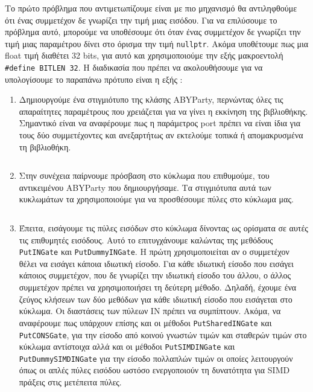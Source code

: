 Το πρώτο πρόβλημα που αντιμετωπίζουμε είναι με πιο μηχανισμό θα αντιληφθούμε ότι ένας συμμετέχον δε γνωρίζει την τιμή μιας εισόδου. Για να επιλύσουμε το πρόβλημα αυτό, μπορούμε να υποθέσουμε ότι όταν ένας συμμετέχον δε γνωρίζει την τιμή μιας παραμέτρου δίνει στο όρισμα την τιμή \texttt{nullptr}. Ακόμα υποθέτουμε πως μια float τιμή διαθέτει 32 bits, για αυτό και χρησιμοποιούμε την εξής μακροεντολή \texttt{#define BITLEN 32}. Η διαδικασία που πρέπει να ακολουθήσουμε για να υπολογίσουμε το παραπάνω πρότυπο είναι η εξής :

\begin{enumerate}
    \item Δημιουργούμε ένα στιγμιότυπο της κλάσης ABYParty, περνώντας όλες τις απαραίτητες παραμέτρους που χρειάζεται για να γίνει η εκκίνηση της βιβλιοθήκης. Σημαντικό είναι να αναφέρουμε πως η παράμετρος port πρέπει να είναι ίδια για τους δύο συμμετέχοντες και ανεξαρτήτως αν εκτελούμε τοπικά ή απομακρυσμένα τη βιβλιοθήκη.
    \begin{longlisting}
        \begin{center}
            \inputminted[fontsize=\scriptsize,frame=single]{cpp}{./01_body/code/aby-example-step-1.cpp}
        \end{center}
    \end{longlisting}
    \item Στην συνέχεια παίρνουμε πρόσβαση στο κύκλωμα που επιθυμούμε, του αντικειμένου ABYParty που δημιουργήσαμε. Τα στιγμιότυπα αυτά των κυκλωμάτων τα χρησιμοποιούμε για να προσθέσουμε πύλες στο κύκλωμα μας.
    \begin{longlisting}
        \begin{center}
          \inputminted[fontsize=\scriptsize,frame=single]{cpp}{./01_body/code/aby-example-step-2.cpp}
        \end{center}
    \end{longlisting}
    \item Έπειτα, εισάγουμε τις πύλες εισόδων στο κύκλωμα δίνοντας ως ορίσματα σε αυτές τις επιθυμητές εισόδους. Αυτό το επιτυγχάνουμε καλώντας της μεθόδους \texttt{PutINGate} και \texttt{PutDummyINGate}. Η πρώτη χρησιμοποιείται αν ο συμμετέχον θέλει να εισάγει κάποια ιδιωτική είσοδο. Για κάθε ιδιωτική είσοδο που εισάγει κάποιος συμμετέχον, που δε γνωρίζει την ιδιωτική είσοδο του άλλου, ο άλλος συμμετέχον πρέπει να χρησιμοποιήσει τη δεύτερη μέθοδο. Δηλαδή, έχουμε ένα ζεύγος κλήσεων των δύο μεθόδων για κάθε ιδιωτική είσοδο που εισάγεται στο κύκλωμα. Οι διαστάσεις των πύλεων IN πρέπει να συμπίπτουν. Ακόμα, να αναφέρουμε πως υπάρχουν επίσης και οι μέθοδοι \texttt{PutSharedINGate} και \texttt{PutCONSGate}, για την είσοδο από κοινού γνωστών τιμών και σταθερών τιμών στο κύκλωμα αντίστοιχα αλλά και οι μέθοδοι \texttt{PutSIMDINGate} και \texttt{PutDummySIMDINGate} για την είσοδο πολλαπλών τιμών οι οποίες λειτουργούν όπως οι απλές πύλες εισόδου ωστόσο ενεργοποιούν τη δυνατότητα για SIMD πράξεις στις μετέπειτα πύλες.

\end{enumerate}
